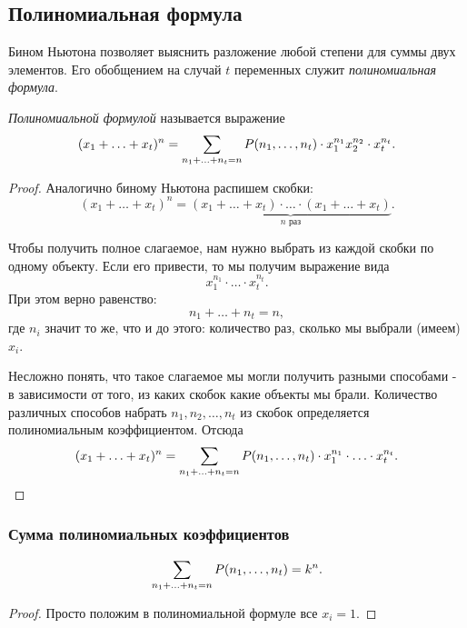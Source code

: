\subsection{Полиномиальная формула}

\begin{definition}
	Бином Ньютона позволяет выяснить разложение любой степени для суммы двух элементов. Его обобщением на случай $t$ переменных служит \textit{полиномиальная формула}.
\end{definition}

\begin{theorem}
	\textit{Полиномиальной формулой} называется выражение
	\[
		(x_1 + \ldots + x_t)^n = \sum\limits_{n_1 + \ldots + n_t = n} P(n_1, \ldots, n_t) \cdot x_1^{n_1} x_2^{n_2} \cdot x_t^{n_t}.
	\]
\end{theorem}

\begin{proof}
	Аналогично биному Ньютона распишем скобки:
	\[
		(x_1 + \ldots + x_t)^n = \underbrace{(x_1 + \ldots + x_t) \cdot \ldots \cdot (x_1 + \ldots + x_t)}_{n \text{ раз}}.
	\]
	
	Чтобы получить полное слагаемое, нам нужно выбрать из каждой скобки по одному объекту. Если его привести, то мы получим выражение вида
	\[
		x_1^{n_1} \cdot \ldots \cdot x_t^{n_t}.
	\]
	При этом верно равенство:
	\[
		n_1 + \ldots + n_t = n,
	\]
	где $n_i$ значит то же, что и до этого: количество раз, сколько мы выбрали (имеем) $x_i$.
	
	Несложно понять, что такое слагаемое мы могли получить разными способами - в зависимости от того, из каких скобок какие объекты мы брали. Количество различных способов набрать $n_1, n_2, \ldots, n_t$ из скобок определяется полиномиальным коэффициентом. Отсюда 
	\[
		(x_1 + \ldots + x_t)^n = \sum\limits_{n_1 + \ldots + n_t = n} P(n_1, \ldots, n_t) \cdot x_1^{n_1} \cdot \ldots \cdot x_t^{n_t}.
	\]
\end{proof}

\subsubsection*{Сумма полиномиальных коэффициентов}

\begin{proposition}
	\[
		\sum\limits_{n_1 + \ldots + n_t = n} P(n_1, \ldots, n_t) = k^n.
	\]
\end{proposition}

\begin{proof}
	Просто положим в полиномиальной формуле все $x_i = 1$.
\end{proof}

